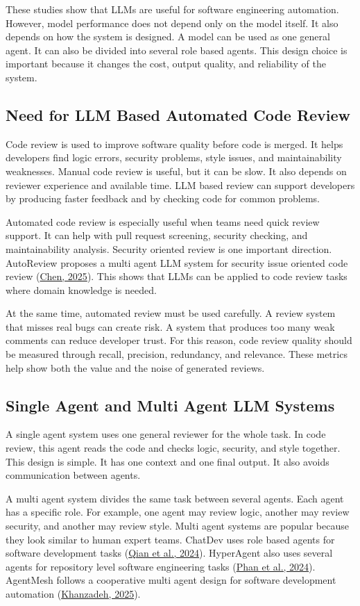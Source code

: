 \documentclass[pdflatex,sn-mathphys-num]{sn-jnl}
\newcommand{\apa}[2]{\hyperlink{cite.#1}{#2}}
\theoremstyle{thmstyleone}
\theoremstyle{thmstyletwo}
\theoremstyle{thmstylethree}
\begin{document}
These studies show that LLMs are useful for software engineering automation. However, model performance does not depend only on the model itself. It also depends on how the system is designed. A model can be used as one general agent. It can also be divided into several role based agents. This design choice is important because it changes the cost, output quality, and reliability of the system.

\subsection{Need for LLM Based Automated Code Review}

Code review is used to improve software quality before code is merged. It helps developers find logic errors, security problems, style issues, and maintainability weaknesses. Manual code review is useful, but it can be slow. It also depends on reviewer experience and available time. LLM based review can support developers by producing faster feedback and by checking code for common problems.

Automated code review is especially useful when teams need quick review support. It can help with pull request screening, security checking, and maintainability analysis. Security oriented review is one important direction. AutoReview proposes a multi agent LLM system for security issue oriented code review (\apa{chen2025}{Chen, 2025}). This shows that LLMs can be applied to code review tasks where domain knowledge is needed.

At the same time, automated review must be used carefully. A review system that misses real bugs can create risk. A system that produces too many weak comments can reduce developer trust. For this reason, code review quality should be measured through recall, precision, redundancy, and relevance. These metrics help show both the value and the noise of generated reviews.

\subsection{Single Agent and Multi Agent LLM Systems}

A single agent system uses one general reviewer for the whole task. In code review, this agent reads the code and checks logic, security, and style together. This design is simple. It has one context and one final output. It also avoids communication between agents.

A multi agent system divides the same task between several agents. Each agent has a specific role. For example, one agent may review logic, another may review security, and another may review style. Multi agent systems are popular because they look similar to human expert teams. ChatDev uses role based agents for software development tasks (\apa{qian2024}{Qian et al., 2024}). HyperAgent also uses several agents for repository level software engineering tasks (\apa{phan2024}{Phan et al., 2024}). AgentMesh follows a cooperative multi agent design for software development automation (\apa{khanzadeh2025}{Khanzadeh, 2025}).
\end{document}
